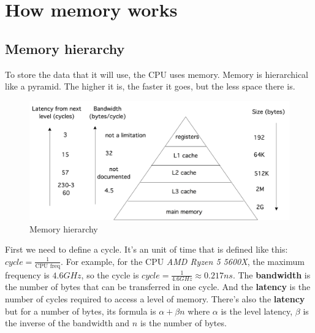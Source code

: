 \documentclass[12pt, openany]{report}
\theoremstyle{definition}
\begin{document}
\section{How memory works}
\subsection{Memory hierarchy} 
To store the data that it will use, the CPU uses memory. Memory is hierarchical like a pyramid. The higher it is, the faster it goes, but the less space there is.
\begin{figure}[H]
    \centering
    \includegraphics[scale=0.15]{img/memory_layout.jpeg}
    \caption{Memory hierarchy}
    \label{fig:memory_hierarchy}
\end{figure}
First we need to define a cycle\label{cycle_def}. It's an unit of time that is defined like this: $cycle = \frac{1}{\text{CPU freq}}$. For example, for the CPU \textit{AMD Ryzen 5 5600X}, the maximum frequency is $4.6 GHz$, so the cycle is $cycle = \frac{1}{4.6 GHz} \approx 0.217 ns$. The \textbf{bandwidth} is the number of bytes that can be transferred in one cycle. And the \textbf{latency} is the number of cycles required to access a level of memory. There's also the \textbf{latency} \label{def_latency} but for a number of bytes, its formula is $\alpha + \beta n$ where $\alpha$ is the level latency, $\beta$ is the inverse of the bandwidth and $n$ is the number of bytes.\\
\end{document}
